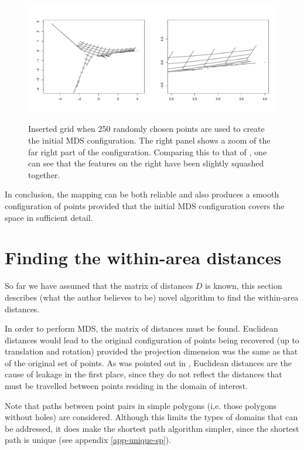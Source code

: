\begin{figure}
\centering
\includegraphics[width=5in]{mds/figs/wt2-grid-samp.pdf} \\
\caption{Inserted grid when 250 randomly chosen points are used to create the initial MDS configuration. The right panel shows a zoom of the far right part of the configuration. Comparing this to that of , one can see that the features on the right have been slightly squashed together.}
\label{wt2-grid-samp}
\end{figure}

In conclusion, the mapping can be both reliable and also produces a smooth configuration of points provided that the initial MDS configuration covers the space in sufficient detail.


\section{Finding the within-area distances}
\label{mdsdist}

So far we have assumed that the matrix of distances $D$ is known, this section describes (what the author believes to be) novel algorithm to find the within-area distances.

In order to perform MDS, the matrix of distances must be found. Euclidean distances would lead to the original configuration of points being recovered (up to translation and rotation) provided the projection dimension was the same as that of the original set of points. As was pointed out in , Euclidean distances are the cause of leakage in the first place, since they do not reflect the distances that must be travelled between points residing in the domain of interest.

Note that paths between point pairs in simple polygons (i,e. those polygons without holes) are considered. Although this limits the types of domains that can be addressed, it does make the shortest path algorithm simpler, since the shortest path is unique (see appendix \ref{app-unique-sp}).

